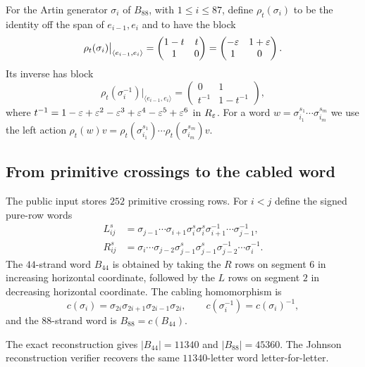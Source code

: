 \begin{definition}\label{def:burau}
For the Artin generator $\sigma_i$ of $B_{88}$, with $1\le i\le87$, define
$\rho_t(\sigma_i)$ to be the identity off the span of
$e_{i-1},e_i$ and to have the block
\[
\rho_t(\sigma_i)\big|_{\langle e_{i-1},e_i\rangle}
=
\begin{pmatrix}1-t&t\\1&0\end{pmatrix}
=
\begin{pmatrix}-\varepsilon&1+\varepsilon\\1&0\end{pmatrix}.
\]
Its inverse has block
\[
\rho_t(\sigma_i^{-1})\big|_{\langle e_{i-1},e_i\rangle}
=
\begin{pmatrix}0&1\\t^{-1}&1-t^{-1}\end{pmatrix},
\]
where $t^{-1}=1-\varepsilon+\varepsilon^2-\varepsilon^3+\varepsilon^4-\varepsilon^5+\varepsilon^6$ in $R_\varepsilon$.
For a word $w=\sigma_{i_1}^{s_1}\cdots\sigma_{i_m}^{s_m}$ we use the left
action $\rho_t(w)v=\rho_t(\sigma_{i_1}^{s_1})\cdots
\rho_t(\sigma_{i_m}^{s_m})v$.
\end{definition}

\subsection{From primitive crossings to the cabled word}

The public input stores $252$ primitive crossing rows.  For $i<j$ define the
signed pure-row words
\begin{align}
L_{ij}^{s}
 &=\sigma_{j-1}\cdots\sigma_{i+1}
   \sigma_i^{s}\sigma_i^{s}
   \sigma_{i+1}^{-1}\cdots\sigma_{j-1}^{-1},
\label{eq:L-row}\\
R_{ij}^{s}
 &=\sigma_i\cdots\sigma_{j-2}
   \sigma_{j-1}^{s}\sigma_{j-1}^{s}
   \sigma_{j-2}^{-1}\cdots\sigma_i^{-1}.
\label{eq:R-row}
\end{align}
The $44$-strand word $B_{44}$ is obtained by taking the $R$ rows on segment
$6$ in increasing horizontal coordinate, followed by the $L$ rows on segment
$2$ in decreasing horizontal coordinate.  The cabling homomorphism is
\begin{equation}\label{eq:cabling}
c(\sigma_i)=\sigma_{2i}\sigma_{2i+1}\sigma_{2i-1}\sigma_{2i},
\qquad
c(\sigma_i^{-1})=c(\sigma_i)^{-1},
\end{equation}
and the $88$-strand word is $B_{88}=c(B_{44})$.

\begin{proposition}\label{prop:word-identities}
The exact reconstruction gives
$|B_{44}|=11340$ and $|B_{88}|=45360$.  The Johnson reconstruction verifier
recovers the same $11340$-letter word letter-for-letter.
\end{proposition}

